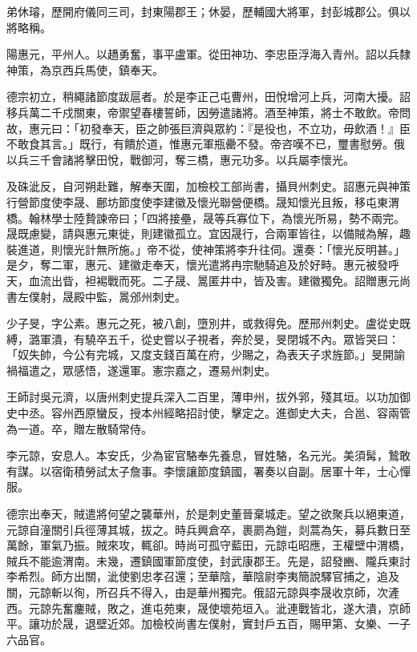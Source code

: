 \begin{pinyinscope}
 弟休璿，歷開府儀同三司，封東陽郡王；休晏，歷輔國大將軍，封彭城郡公。俱以將略稱。



 陽惠元，平州人。以趫勇奮，事平盧軍。從田神功、李忠臣浮海入青州。詔以兵隸神策，為京西兵馬使，鎮奉天。



 德宗初立，稍繩諸節度跋扈者。於是李正己屯曹州，田悅增河上兵，河南大擾。詔移兵萬二千戍關東，帝禦望春樓誓師，因勞遣諸將。酒至神策，將士不敢飲。帝問故，惠元曰：「初發奉天，臣之帥張巨濟與眾約：『是役也，不立功，毋飲酒！』臣不敢食其言。」既行，有饋於道，惟惠元軍瓶罍不發。帝咨嘆不已，璽書慰勞。俄以兵三千會諸將擊田悅，戰御河，奪三橋，惠元功多。以兵屬李懷光。



 及硃泚反，自河朔赴難，解奉天圍，加檢校工部尚書，攝貝州刺史。詔惠元與神策行營節度使李晟、鄜坊節度使李建徽及懷光聯營便橋。晟知懷光且叛，移屯東渭橋。翰林學士陸贄諫帝曰；「四將接壘，晟等兵寡位下，為懷光所易，勢不兩完。晟既慮變，請與惠元東徙，則建徽孤立。宜因晟行，合兩軍皆往，以備賊為解，趣裝進道，則懷光計無所施。」帝不從，使神策將李升往伺。還奏：「懷光反明甚。」是夕，奪二軍，惠元、建徽走奉天，懷光遣將冉宗馳騎追及於好畤。惠元被發呼天，血流出眥，袒裼戰而死。二子晟、暠匿井中，皆及害。建徽獨免。詔贈惠元尚書左僕射，晟殿中監，暠邠州刺史。



 少子旻，字公素。惠元之死，被八創，墮別井，或救得免。歷邢州刺史。盧從史既縛，潞軍潰，有驍卒五千，從史嘗以子視者，奔於旻，旻閉城不內。眾皆哭曰：「奴失帥，今公有完城，又度支錢百萬在府，少賜之，為表天子求旌節。」旻開諭禍福遣之，眾感悟，遂還軍。憲宗嘉之，遷易州刺史。



 王師討吳元濟，以唐州刺史提兵深入二百里，薄申州，拔外郛，殘其垣。以功加御史中丞。容州西原蠻反，授本州經略招討使，擊定之。進御史大夫，合邕、容兩管為一道。卒，贈左散騎常侍。



 李元諒，安息人。本安氏，少為宦官駱奉先養息，冒姓駱，名元光。美須髯，鷙敢有謀。以宿衛積勞試太子詹事。李懷讓節度鎮國，署奏以自副。居軍十年，士心憚服。



 德宗出奉天，賊遣將何望之襲華州，於是刺史董晉棄城走。望之欲聚兵以絕東道，元諒自潼關引兵徑薄其城，拔之。時兵興倉卒，裹罽為鎧，剡蒿為矢，募兵數日至萬餘，軍氣乃振。賊來攻，輒卻。時尚可孤守藍田，元諒屯昭應，王權壁中渭橋，賊兵不能逾渭南。未幾，遷鎮國軍節度使，封武康郡王。先是，詔發豳、隴兵東討李希烈。師方出關，泚使劉忠孝召還；至華陰，華陰尉李夷簡說驛官捕之，追及關，元諒斬以徇，所召兵不得入，由是華州獨完。俄詔元諒與李晟收京師，次滻西。元諒先奮鏖賊，敗之，進屯苑東，晟使壞苑垣入。泚連戰皆北，遂大潰，京師平。讓功於晟，退壁近郊。加檢校尚書左僕射，實封戶五百，賜甲第、女樂、一子六品官。




\end{pinyinscope}
